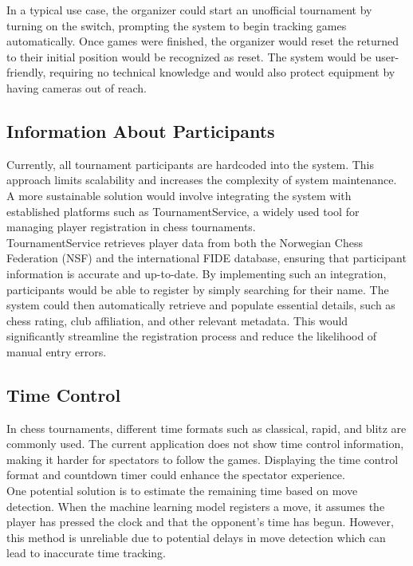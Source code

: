 In a typical use case, the organizer could start an unofficial tournament by turning on the switch, prompting the system to begin tracking games automatically. Once games were finished, the organizer would reset the  returned to their initial position would be recognized as reset. The system would be user-friendly, requiring no technical knowledge and would also protect equipment by having cameras out of reach.

\subsection{Information About Participants}
Currently, all tournament participants are hardcoded into the system. This approach limits scalability and increases the complexity of system maintenance. A more sustainable solution would involve integrating the system with established platforms such as TournamentService, a widely used tool for managing player registration in chess tournaments. \\

TournamentService retrieves player data from both the Norwegian Chess Federation (NSF) and the international FIDE database, ensuring that participant information is accurate and up-to-date.
By implementing such an integration, participants would be able to register by simply searching for their name. The system could then automatically retrieve and populate essential details, such as chess rating, club affiliation, and other relevant metadata. This would significantly streamline the registration process and reduce the likelihood of manual entry errors. \\


\subsection{Time Control}
In chess tournaments, different time formats such as \gls{classical}, \gls{rapid}, and \gls{blitz} are commonly used. The current application does not show time control information, making it harder for spectators to follow the games. Displaying the time control format and countdown timer could enhance the spectator experience. \\

One potential solution is to estimate the remaining time based on move detection. When the machine learning model registers a move, it assumes the player has pressed the clock and that the opponent’s time has begun. However, this method is unreliable due to potential delays in move detection which can lead to inaccurate time tracking. \\


